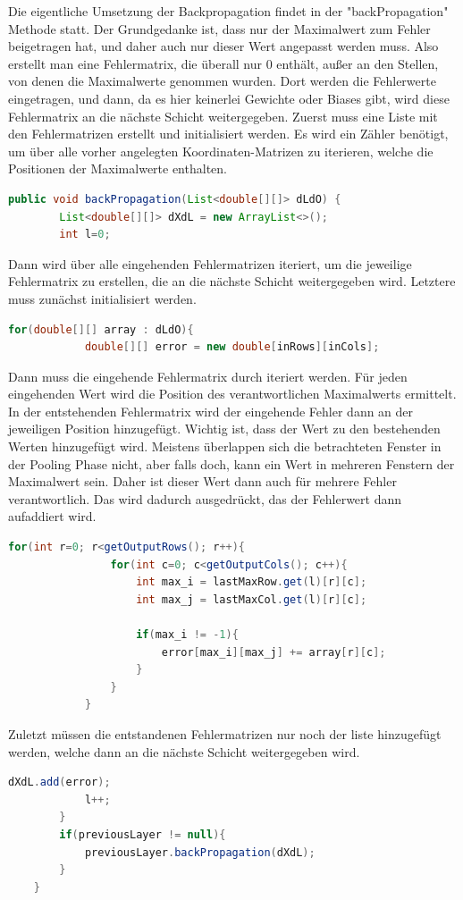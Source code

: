 \documentclass[12pt]{article}
\begin{document}
Die eigentliche Umsetzung der Backpropagation findet in der "backPropagation" Methode statt. Der Grundgedanke ist, dass nur der Maximalwert zum Fehler beigetragen hat, und daher auch nur dieser Wert angepasst werden muss. Also erstellt man eine Fehlermatrix, die überall nur 0 enthält, außer an den Stellen, von denen die Maximalwerte genommen wurden. Dort werden die Fehlerwerte eingetragen, und dann, da es hier keinerlei Gewichte oder Biases gibt, wird diese Fehlermatrix an die nächste Schicht weitergegeben.
Zuerst muss eine Liste mit den Fehlermatrizen erstellt und initialisiert werden. Es wird ein Zähler benötigt, um über alle vorher angelegten Koordinaten-Matrizen zu iterieren, welche die Positionen der Maximalwerte enthalten.
\begin{lstlisting}[language=Java]
    public void backPropagation(List<double[][]> dLdO) {
        List<double[][]> dXdL = new ArrayList<>();
        int l=0;
\end{lstlisting}
Dann wird über alle eingehenden Fehlermatrizen iteriert, um die jeweilige Fehlermatrix zu erstellen, die an die nächste Schicht weitergegeben wird. Letztere muss zunächst initialisiert werden.  
\begin{lstlisting}[language=Java]
        for(double[][] array : dLdO){
            double[][] error = new double[inRows][inCols];
\end{lstlisting}
Dann muss die eingehende Fehlermatrix durch iteriert werden. Für jeden eingehenden Wert wird die Position des verantwortlichen Maximalwerts ermittelt. In der entstehenden Fehlermatrix wird der eingehende Fehler dann an der jeweiligen Position hinzugefügt. Wichtig ist, dass der Wert zu den bestehenden Werten hinzugefügt wird. 
Meistens überlappen sich die betrachteten Fenster in der Pooling Phase nicht, aber falls doch, kann ein Wert in mehreren Fenstern der Maximalwert sein. 
Daher ist dieser Wert dann auch für mehrere Fehler verantwortlich. Das wird dadurch ausgedrückt, das der Fehlerwert dann aufaddiert wird.
\begin{lstlisting}[language=Java]
            for(int r=0; r<getOutputRows(); r++){
                for(int c=0; c<getOutputCols(); c++){
                    int max_i = lastMaxRow.get(l)[r][c];
                    int max_j = lastMaxCol.get(l)[r][c];

                    if(max_i != -1){
                        error[max_i][max_j] += array[r][c];
                    }
                }
            }
\end{lstlisting}
Zuletzt müssen die entstandenen Fehlermatrizen nur noch der liste hinzugefügt werden, welche dann an die nächste Schicht weitergegeben wird.  
\begin{lstlisting}[language=Java]
            dXdL.add(error);
            l++;
        }
        if(previousLayer != null){
            previousLayer.backPropagation(dXdL);
        }
    }
\end{lstlisting}
\end{document}
